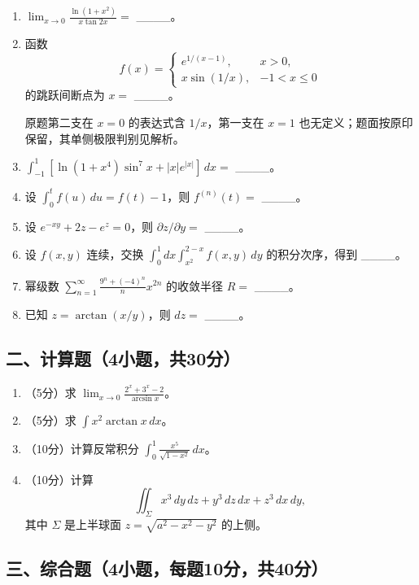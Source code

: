 \documentclass[11pt,fontset=fandol]{ctexart}
\begin{document}
\begin{enumerate}
\def\labelenumi{\arabic{enumi}.}
\item
  \(\displaystyle\lim_{x\to0}\frac{\ln(1+x^2)}{x\tan2x}=\) \_\_\_\_。
\item
  函数 \[
  f(x)=\begin{cases}e^{1/(x-1)},&x>0,\\x\sin(1/x),&-1<x\le0\end{cases}
  \] 的跳跃间断点为 \(x=\) \_\_\_\_。

  原题第二支在 \(x=0\) 的表达式含 \(1/x\)，第一支在 \(x=1\)
  也无定义；题面按原印保留，其单侧极限判别见解析。
\item
  \(\displaystyle\int_{-1}^1[\ln(1+x^4)\sin^7x+|x|e^{|x|}]\,dx=\)
  \_\_\_\_。
\item
  设 \(\displaystyle\int_0^tf(u)\,du=f(t)-1\)，则 \(f^{(n)}(t)=\)
  \_\_\_\_。
\item
  设 \(e^{-xy}+2z-e^z=0\)，则 \(\partial z/\partial y=\) \_\_\_\_。
\item
  设 \(f(x,y)\) 连续，交换
  \(\displaystyle\int_0^1dx\int_{x^2}^{2-x}f(x,y)\,dy\) 的积分次序，得到
  \_\_\_\_。
\item
  幂级数 \(\displaystyle\sum_{n=1}^\infty\frac{9^n+(-4)^n}{n}x^{2n}\)
  的收敛半径 \(R=\) \_\_\_\_。
\item
  已知 \(z=\arctan(x/y)\)，则 \(dz=\) \_\_\_\_。
\end{enumerate}

\subsection{二、计算题（4小题，共30分）}\label{ux4e8cux8ba1ux7b97ux98984ux5c0fux9898ux517130ux5206}

\begin{enumerate}
\def\labelenumi{\arabic{enumi}.}
\item
  （5分）求 \(\displaystyle\lim_{x\to0}\frac{2^x+3^x-2}{\arcsin x}\)。
\item
  （5分）求 \(\displaystyle\int x^2\arctan x\,dx\)。
\item
  （10分）计算反常积分
  \(\displaystyle\int_0^1\frac{x^5}{\sqrt{1-x^2}}\,dx\)。
\item
  （10分）计算 \[
  \iint_\Sigma x^3\,dy\,dz+y^3\,dz\,dx+z^3\,dx\,dy,
  \] 其中 \(\Sigma\) 是上半球面 \(z=\sqrt{a^2-x^2-y^2}\) 的上侧。
\end{enumerate}

\subsection{三、综合题（4小题，每题10分，共40分）}\label{ux4e09ux7efcux5408ux98984ux5c0fux9898ux6bcfux989810ux5206ux517140ux5206}
\end{document}
